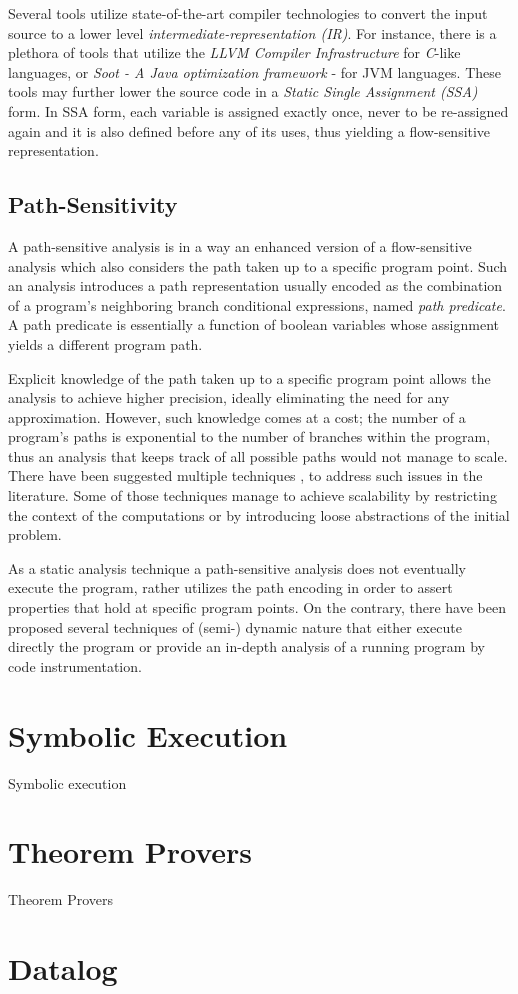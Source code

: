 Several tools utilize state-of-the-art compiler technologies to
convert the input source to a lower level \emph{intermediate-representation (IR)}.
For instance, there is a plethora of tools that utilize the \emph{LLVM Compiler 
Infrastructure}\cite{llvm-lattner} for \emph{C}-like languages,
or \emph{Soot - A Java optimization framework}\cite{soot} - for JVM languages.
These tools may further lower the source code in a
\emph{Static Single Assignment (SSA)} form. In SSA form, each variable is
assigned exactly once, never to be re-assigned again and it is also defined
before any of its uses, thus yielding a flow-sensitive representation.

\subsection{Path-Sensitivity}

A path-sensitive analysis is in a way an enhanced version of a
flow-sensitive analysis which also considers the path taken up to
a specific program point. Such an analysis
introduces a path representation usually encoded as the combination of
a program's neighboring branch conditional expressions,
named \textit{path predicate}. A path predicate is essentially a
function of boolean variables whose assignment yields a
different program path.

Explicit knowledge of the path taken up to a specific
program point allows the analysis to achieve higher
precision, ideally eliminating the need for any approximation.
However, such knowledge comes at a cost; the number of a program's
paths is exponential to the number of branches within the program,
thus an analysis that keeps track of all possible paths would not
manage to scale. There have been suggested multiple techniques
\cite{dillig2008sound}, \cite{das2002esp} to address such issues
in the literature. Some of those techniques manage to achieve
scalability by restricting the context of the computations or
by introducing loose abstractions of the initial problem.

As a static analysis technique a path-sensitive analysis does not
eventually execute the program, rather utilizes
the path encoding in order to assert properties that hold at
specific program points. On the contrary, there have been
proposed several techniques of (semi-) dynamic nature
that either execute directly the program or provide
an in-depth analysis of a running program by code
instrumentation.

\section{Symbolic Execution}

Symbolic execution

\section{Theorem Provers}

Theorem Provers

\section{Datalog}
